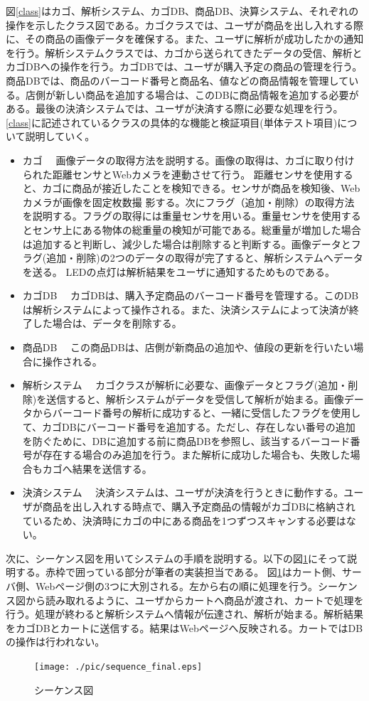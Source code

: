 図\ref{class}はカゴ、解析システム、カゴDB、商品DB、決算システム、それぞれの操作を示したクラス図である。カゴクラスでは、ユーザが商品を出し入れする際に、その商品の画像データを確保する。また、ユーザに解析が成功したかの通知を行う。解析システムクラスでは、カゴから送られてきたデータの受信、解析とカゴDBへの操作を行う。カゴDBでは、ユーザが購入予定の商品の管理を行う。商品DBでは、商品のバーコード番号と商品名、値などの商品情報を管理している。店側が新しい商品を追加する場合は、このDBに商品情報を追加する必要がある。最後の決済システムでは、ユーザが決済する際に必要な処理を行う。
　\ref{class}に記述されているクラスの具体的な機能と検証項目(単体テスト項目)について説明していく。
\begin{itemize}
\item カゴ
　画像データの取得方法を説明する。画像の取得は、カゴに取り付けられた距離センサとWebカメラを連動させて行う。
距離センサを使用すると、カゴに商品が接近したことを検知できる。センサが商品を検知後、Webカメラが画像を固定枚数撮
影する。次にフラグ（追加・削除）の取得方法を説明する。フラグの取得には重量センサを用いる。重量センサを使用するとセンサ上にある物体の総重量の検知が可能である。総重量が増加した場合は追加すると判断し、減少した場合は削除すると判断する。画像データとフラグ(追加・削除)の2つのデータの取得が完了すると、解析システムへデータを送る。
LEDの点灯は解析結果をユーザに通知するためものである。
\item カゴDB
　カゴDBは、購入予定商品のバーコード番号を管理する。このDBは解析システムによって操作される。また、決済システムによって決済が終了した場合は、データを削除する。
\item 商品DB
　この商品DBは、店側が新商品の追加や、値段の更新を行いたい場合に操作される。
\item 解析システム
　カゴクラスが解析に必要な、画像データとフラグ(追加・削除)を送信すると、解析システムがデータを受信して解析が始まる。画像データからバーコード番号の解析に成功すると、一緒に受信したフラグを使用して、カゴDBにバーコード番号を追加する。ただし、存在しない番号の追加を防ぐために、DBに追加する前に商品DBを参照し、該当するバーコード番号が存在する場合のみ追加を行う。また解析に成功した場合も、失敗した場合もカゴへ結果を送信する。
\item 決済システム
　決済システムは、ユーザが決済を行うときに動作する。ユーザが商品を出し入れする時点で、購入予定商品の情報がカゴDBに格納されているため、決済時にカゴの中にある商品を1つずつスキャンする必要はない。
\end{itemize}


次に、シーケンス図を用いてシステムの手順を説明する。以下の図\ref{sequence}にそって説明する。赤枠で囲っている部分が筆者の実装担当である。
図\ref{sequence}はカート側、サーバ側、Webページ側の3つに大別される。左から右の順に処理を行う。シーケンス図から読み取れるように、ユーザからカートへ商品が渡され、カートで処理を行う。処理が終わると解析システムへ情報が伝達され、解析が始まる。解析結果をカゴDBとカートに送信する。結果はWebページへ反映される。カートではDBの操作は行われない。

\begin{figure}[htbp]
\centering
\texttt{[image: ./pic/sequence\_final.eps]}
\caption{シーケンス図}
\label{sequence}
\end{figure}